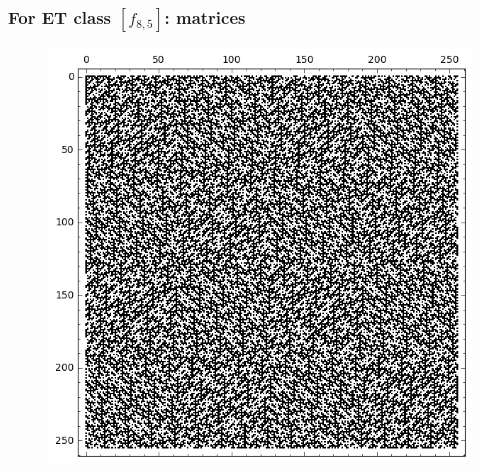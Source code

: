 \documentclass[pdf,sprung,slideColor,nocolorBG]{beamer}
\newenvironment{colortheme}[1]{
\def\ProvidesPackageRCS $##1${\relax}
\renewcommand{\ProcessOptions}{\relax}
\makeatletter

\makeatother
}{}
\begin{document}
\begin{colortheme}{jubata}
\begin{frame}
\frametitle{For ET class $[f_{8,5}]$: matrices}
\begin{figure}
\centering
\begin{minipage}{.48\textwidth}
  \centering
  \includegraphics[width=.9\linewidth]{../matrix_plot/re8_5_weight_class_matrix.png}
  \label{fig:8_5_weight_class_matrix}
\end{minipage}%
\begin{minipage}{.48\textwidth}

\end{minipage}
\end{figure}
\end{frame}
\end{colortheme}
\end{document}
